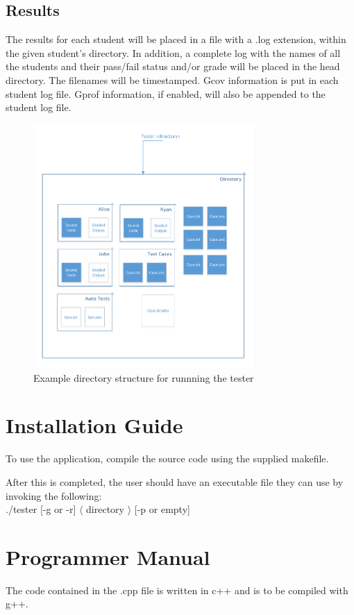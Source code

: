 \subsection{Results}
The results for each student will be placed in a file with a .log extension, within the given student's directory. 
In addition, a complete log with the names of all the students and their pass/fail status and/or grade will be placed 
in the head directory. The filenames will be timestamped. Gcov information is put in each student log file. Gprof information, if enabled, will also be appended to the student log file.

\begin{figure}[H]
\begin{center}
\includegraphics[width=0.75\textwidth]{./Dir_struct}
\end{center}
\caption{Example directory structure for runnning the tester \label{dir}}
\end{figure}

\section{Installation Guide}
To use the application, compile the source code using the supplied makefile.

After this is completed, the user should have an
executable file they can use by invoking the following: \\
./tester [-g or -r] $\langle$ directory $\rangle$ [-p or empty]

\section{Programmer Manual}
The code contained in the .cpp file is written in c++ and is to be compiled with g++.
